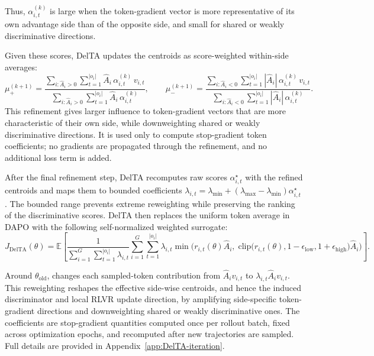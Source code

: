 \documentclass{article} %
\begin{document}
Thus, \(\alpha_{i,t}^{(k)}\) is large when the token-gradient vector is more representative of its own advantage side than of the opposite side, and small for shared or weakly discriminative directions. 

Given these scores, DelTA updates the centroids as score-weighted within-side averages:
\begin{equation}
\label{eq:DelTA-center-update}
\mu_+^{(k+1)}
=
\frac{
\sum_{i:\hat A_i>0}\sum_{t=1}^{|o_i|}
\hat A_i\,\alpha_{i,t}^{(k)}\,v_{i,t}
}{
\sum_{i:\hat A_i>0}\sum_{t=1}^{|o_i|}
\hat A_i\,\alpha_{i,t}^{(k)}
},
\qquad
\mu_-^{(k+1)}
=
\frac{
\sum_{i:\hat A_i<0}\sum_{t=1}^{|o_i|}
|\hat A_i|\,\alpha_{i,t}^{(k)}\,v_{i,t}
}{
\sum_{i:\hat A_i<0}\sum_{t=1}^{|o_i|}
|\hat A_i|\,\alpha_{i,t}^{(k)}
}.
\end{equation}
This refinement gives larger influence to token-gradient vectors that are more characteristic of their own side, while downweighting shared or weakly discriminative directions. 
It is used only to compute stop-gradient token coefficients; no gradients are propagated through the refinement, and no additional loss term is added.

After the final refinement step, DelTA recomputes raw scores \(\alpha_{i,t}^{\star}\) with the refined centroids and maps them to bounded coefficients \(\lambda_{i,t}=\lambda_{\min}+(\lambda_{\max}-\lambda_{\min})\alpha_{i,t}^{\star}\). 
The bounded range prevents extreme reweighting while preserving the ranking of the discriminative scores. 
DelTA then replaces the uniform token average in DAPO with the following self-normalized weighted surrogate:
\begin{equation}
\label{eq:DelTA-weighted-objective}
J_{\mathrm{DelTA}}(\theta)
=
\mathbb{E}\!\left[
\frac{
1
}{
\sum_{i=1}^{G}\sum_{t=1}^{|o_i|}\lambda_{i,t}
}
\sum_{i=1}^{G}\sum_{t=1}^{|o_i|}
\lambda_{i,t}
\min\!\Big(
r_{i,t}(\theta)\hat A_i,\;
\mathrm{clip}\!\big(
r_{i,t}(\theta),
1-\epsilon_{\mathrm{low}},
1+\epsilon_{\mathrm{high}}
\big)\hat A_i
\Big)
\right].
\end{equation}

Around \(\theta_{\mathrm{old}}\),  changes each sampled-token contribution from \(\hat A_i v_{i,t}\) to \(\lambda_{i,t}\hat A_i v_{i,t}\). 
This reweighting reshapes the effective side-wise centroids, and hence the induced discriminator and local RLVR update direction, by amplifying side-specific token-gradient directions and downweighting shared or weakly discriminative ones. 
The coefficients are stop-gradient quantities computed once per rollout batch, fixed across optimization epochs, and recomputed after new trajectories are sampled. 
Full details are provided in Appendix~\ref{app:DelTA-iteration}.
\end{document}

